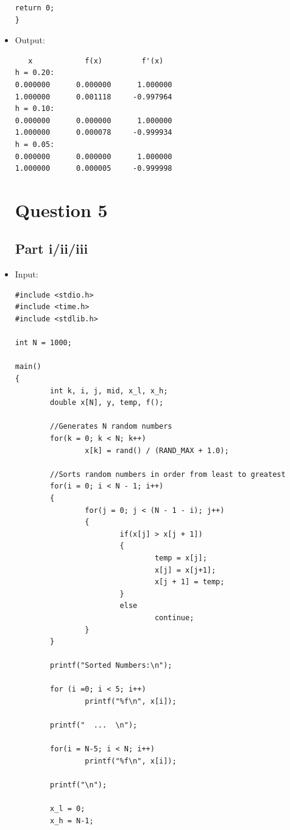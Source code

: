 \documentclass[10pt]{article}
\begin{document}
\begin{itemize}
\begin{verbatim}
return 0;
}
\end{verbatim}
\item Output:
\begin{verbatim}
   x            f(x)         f'(x)
h = 0.20:
0.000000      0.000000      1.000000
1.000000      0.001118     -0.997964
h = 0.10:
0.000000      0.000000      1.000000
1.000000      0.000078     -0.999934
h = 0.05:
0.000000      0.000000      1.000000
1.000000      0.000005     -0.999998
\end{verbatim}
\section*{Question 5}
\subsection*{Part i/ii/iii}
\item Input:
\begin{verbatim}
#include <stdio.h>
#include <time.h>
#include <stdlib.h>

int N = 1000;

main()
{
        int k, i, j, mid, x_l, x_h;
        double x[N], y, temp, f();
        
        //Generates N random numbers
        for(k = 0; k < N; k++) 
                x[k] = rand() / (RAND_MAX + 1.0);
   
        //Sorts random numbers in order from least to greatest
        for(i = 0; i < N - 1; i++)
        {
                for(j = 0; j < (N - 1 - i); j++)
                {
                        if(x[j] > x[j + 1])
                        {
                                temp = x[j];
                                x[j] = x[j+1];
                                x[j + 1] = temp;
                        }
                        else
                                continue;
                }
        }
        
        printf("Sorted Numbers:\n");

        for (i =0; i < 5; i++)
                printf("%f\n", x[i]);

        printf("  ...  \n");
        
        for(i = N-5; i < N; i++)
                printf("%f\n", x[i]);

        printf("\n");

        x_l = 0;
        x_h = N-1;


\end{verbatim}
\end{itemize}
\end{document}
